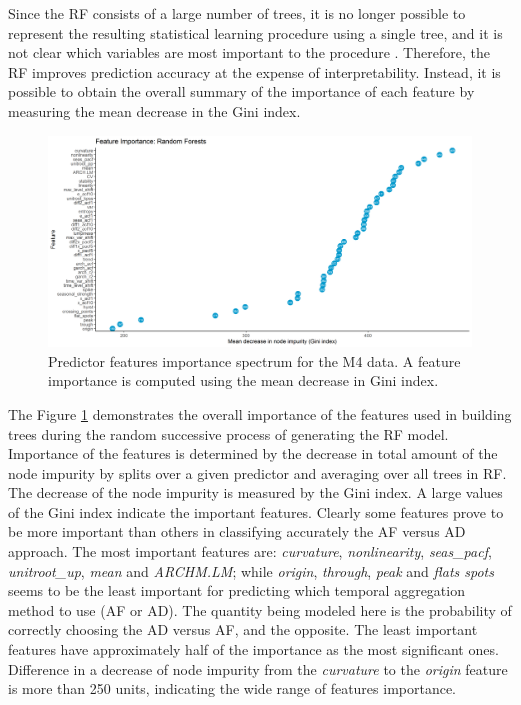 \documentclass[preprint, 3p,
authoryear]{elsarticle} %
\begin{document}
Since the RF consists of a large number of trees, it is no longer
possible to represent the resulting statistical learning procedure using
a single tree, and it is not clear which variables are most important to
the procedure \citep{james2013introduction}. Therefore, the RF improves
prediction accuracy at the expense of interpretability. Instead, it is
possible to obtain the overall summary of the importance of each feature
by measuring the mean decrease in the Gini index.

\begin{figure}[H]

{\centering \includegraphics[width=0.95\linewidth]{img/300dpi/Fig_importance} 

}

\caption{Predictor features importance spectrum for the M4 data. A feature importance is computed using the mean decrease in Gini index.}\label{fig:RFpartial}
\end{figure}

The Figure \ref{fig:RFpartial} demonstrates the overall importance of
the features used in building trees during the random successive process
of generating the RF model. Importance of the features is determined by
the decrease in total amount of the node impurity by splits over a given
predictor and averaging over all trees in RF. The decrease of the node
impurity is measured by the Gini index. A large values of the Gini index
indicate the important features. Clearly some features prove to be more
important than others in classifying accurately the AF versus AD
approach. The most important features are: \emph{curvature},
\emph{nonlinearity}, \emph{seas\_pacf}, \emph{unitroot\_up}, \emph{mean}
and \emph{ARCHM.LM}; while \emph{origin}, \emph{through}, \emph{peak}
and \emph{flats spots} seems to be the least important for predicting
which temporal aggregation method to use (AF or AD). The quantity being
modeled here is the probability of correctly choosing the AD versus AF,
and the opposite. The least important features have approximately half
of the importance as the most significant ones. Difference in a decrease
of node impurity from the \emph{curvature} to the \emph{origin} feature
is more than 250 units, indicating the wide range of features
importance.
\end{document}
